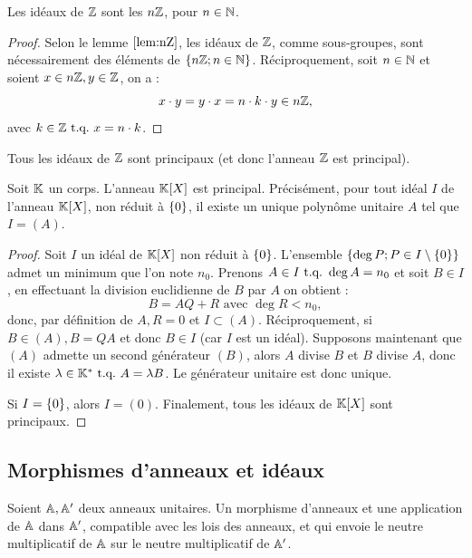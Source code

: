 \begin{thm}[Idéaux de $\Z$]
Les idéaux de $\Z$ sont les $n\mathbb{Z}$, pour $n \in \mathbb{N}$.
\end{thm}

\begin{proof}
Selon le lemme $\ref{lem:nZ}$, les idéaux de $\Z$, comme sous-groupes, sont nécessairement des éléments de $\{ n\mathbb{Z} ; n \in \mathbb{N} \}$.
Réciproquement, soit $n \in \mathbb{N}$ et soient $x \in n\mathbb{Z}, y \in \mathbb{Z}$, on a :
\[ x \cdot y = y \cdot x = n \cdot k \cdot y \in n\mathbb{Z} , \]
avec $k \in \mathbb{Z} \text{~t.q.~} x = n \cdot k$.
\end{proof}

\begin{coro}
Tous les idéaux de $\Z$ sont principaux (et donc l'anneau $\Z$ est principal).
\end{coro}

\begin{thm}
\label{thm:ideauxKx}
Soit $\mathbb{K}$ un corps. L'anneau $\mathbb{K}[X]$ est principal. Précisément, pour tout idéal $I$ de l'anneau $\mathbb{K}[X]$, non réduit à $\{ 0 \}$, 
il existe un unique polynôme unitaire $A$ tel que $I=(A)$. 
\end{thm}

\begin{proof}
Soit $I$ un idéal de $\mathbb{K}[X]$ non réduit à $\{ 0 \}$. L'ensemble $\{ \deg{P} ; P \in I \setminus \{ 0 \} \}$ admet un minimum 
que l'on note $n_0$.
Prenons $A \in I \text{~t.q.~} \deg{A} = n_0$ et soit $B \in I$, en effectuant la division euclidienne de $B$ par $A$ on obtient :
\[ B = AQ + R \text{~avec~} \deg{R} < n_0 ,\] 
donc, par définition de $A, R = 0$ et $I \subset (A)$.
Réciproquement, si $B \in (A), B = QA$ et donc $B \in I$ (car $I$ est un idéal).
Supposons maintenant que $(A)$ admette un second générateur $(B)$, alors $A$ divise $B$ et $B$ divise $A$, 
donc il existe $\lambda \in \mathbb{K^{\ast}} \text{~t.q.~} A = \lambda B$. Le générateur unitaire est donc unique. \newline

Si $I= \{ 0 \}$, alors $I=(0)$. Finalement, tous les idéaux de $\mathbb{K}[X]$ sont principaux.
\end{proof}

\subsection{Morphismes d'anneaux et idéaux}

\begin{defn}
Soient $\mathbb{A}, \mathbb{A}'$ deux anneaux unitaires. 
Un morphisme d'anneaux et une application de $\mathbb{A}$ dans $\mathbb{A}'$, compatible avec les lois des anneaux,
et qui envoie le neutre multiplicatif de $\mathbb{A}$ sur le neutre multiplicatif de $\mathbb{A}'$.
\end{defn}

